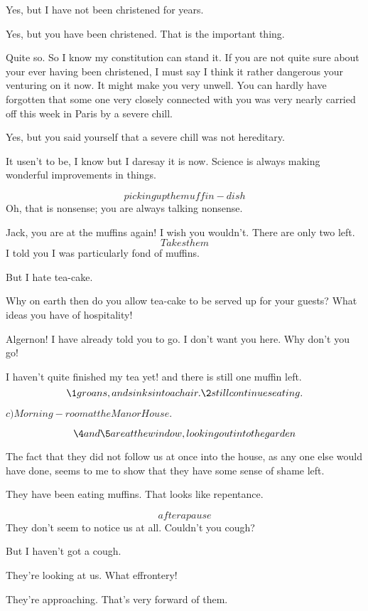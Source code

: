 \documentclass{book}
\begin{document}
\2  Yes, but I have not been christened for years.

\1  Yes, but you have been christened.  That is the important
thing.

\2  Quite so.  So I know my constitution can stand it.  If
you are not quite sure about your ever having been christened, I
must say I think it rather dangerous your venturing on it now.  It
might make you very unwell.  You can hardly have forgotten that
some one very closely connected with you was very nearly carried
off this week in Paris by a severe chill.

\1  Yes, but you said yourself that a severe chill was not
hereditary.

\2  It usen't to be, I know \textemdash but I daresay it is now.
Science is always making wonderful improvements in things.

\1  \[picking up the muffin-dish\]  Oh, that is nonsense; you are
always talking nonsense.

\2  Jack, you are at the muffins again!  I wish you
wouldn't.  There are only two left.  \[Takes them\]  I told you I
was particularly fond of muffins.

\1  But I hate tea-cake.

\2  Why on earth then do you allow tea-cake to be served up
for your guests?  What ideas you have of hospitality!

\1  Algernon!  I have already told you to go.  I don't want you
here.  Why don't you go!

\2  I haven't quite finished my tea yet! and there is still
one muffin left.
\[\1 groans, and sinks into a chair. \2 still continues eating.\]

\Act \Scene

\(c)Morning-room at the Manor House.\)

\[\4 and \5 are at the window, looking out into the
garden\]

\4  The fact that they did not follow us at once into the
house, as any one else would have done, seems to me to show that
they have some sense of shame left.

\5  They have been eating muffins.  That looks like
repentance.

\4  \[after a pause\]  They don't seem to notice us at all.
Couldn't you cough?

\5  But I haven't got a cough.

\4  They're looking at us.  What effrontery!

\5  They're approaching.  That's very forward of them.
\end{document}
